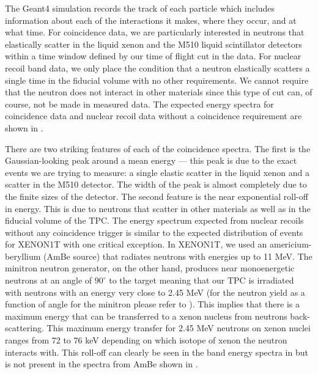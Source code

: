 The Geant4 simulation records the track of each particle which includes information about each of the interactions it makes, where they occur, and at what time.  For coincidence data, we are particularly interested in neutrons that elastically scatter in the liquid xenon and the M510 liquid scintillator detectors within a time window defined by our time of flight cut in the data.  For nuclear recoil band data, we only place the condition that a neutron elastically scatters a single time in the fiducial volume with no other requirements.  We cannot require that the neutron does not interact in other materials since this type of cut can, of course, not be made in measured data.  The expected energy spectra for coincidence data and nuclear recoil data without a coincidence requirement are shown in .

There are two striking features of each of the coincidence spectra.  The first is the Gaussian-looking peak around a mean energy --- this peak is due to the exact events we are trying to measure: a single elastic scatter in the liquid xenon and a scatter in the M510 detector.  The width of the peak is almost completely due to the finite sizes of the detector.  The second feature is the near exponential roll-off in energy.  This is due to neutrons that scatter in other materials as well as in the fiducial volume of the TPC.  The energy spectrum expected from nuclear recoils without any coincidence trigger is similar to the expected distribution of events for XENON1T with one critical exception.  In XENON1T, we used an americium-beryllium (AmBe source) that radiates neutrons with energies up to 11 MeV.  The minitron neutron generator, on the other hand, produces near monoenergetic neutrons at an angle of $90^{\circ}$ to the target meaning that our TPC is irradiated with neutrons with an energy very close to 2.45 MeV (for the neutron yield as a function of angle for the minitron please refer to ).  This implies that there is a maximum energy that can be transferred to a xenon nucleus from neutrons back-scattering.  This maximum energy transfer for 2.45 MeV neutrons on xenon nuclei ranges from 72 to 76 keV depending on which isotope of xenon the neutron interacts with.  This roll-off can clearly be seen in the band energy spectra in  but is not present in the spectra from AmBe shown in .



